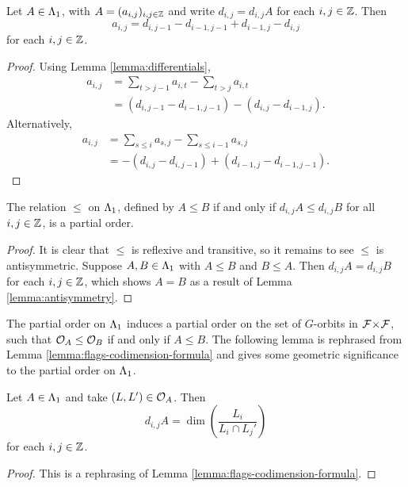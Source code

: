 \documentclass[a4paper, 11pt]{report}
\begin{document}
\begin{lemma}\label{lemma:antisymmetry}
Let $A\in{\Lambda_1}$, with $A = (a_{i,j})_{i,j\in\mathbb{Z}}$ and write $d_{i,j}=d_{i,j}A$ for each $i,j\in\mathbb{Z}$. Then
\begin{equation*}
a_{i,j} = d_{i,j-1} - d_{i-1,j-1} + d_{i-1,j} - d_{i,j}
\end{equation*}
for each $i,j\in\mathbb{Z}$.
\end{lemma}
\begin{proof}
Using Lemma \ref{lemma:differentials},
\begin{align*}
a_{i,j}
&= \sum_{t>j-1}a_{i,t} - \sum_{t>j}a_{i,t}\\
&= (d_{i,j-1} - d_{i-1,j-1}) - (d_{i,j} - d_{i-1,j}).
\end{align*}
Alternatively,
\begin{align*}
a_{i,j}
&= \sum_{s\le i}a_{s,j} - \sum_{s\le i-1}a_{s,j}\\
&= -(d_{i,j}-d_{i,j-1}) + (d_{i-1,j} - d_{i-1,j-1}).
\end{align*}
\end{proof}

\begin{lemma}\label{lemma:orbit-poset}
The relation $\le$ on ${\Lambda_1}$, defined by $A\le B$ if and only if $d_{i,j}A\le d_{i,j}B$ for all $i,j\in\mathbb{Z}$, is a partial order.
\end{lemma}

\begin{proof}
It is clear that $\le$ is reflexive and transitive, so it remains to see $\le$ is antisymmetric. Suppose $A,B\in{\Lambda_1}$ with $A\le B$ and $B\le A$. Then $d_{i,j}A = d_{i,j}B$ for each $i,j\in\mathbb{Z}$, which shows $A=B$ as a result of Lemma \ref{lemma:antisymmetry}.  
\end{proof}

The partial order on ${\Lambda_1}$ induces a partial order on the set of $G$-orbits in ${\mathcal{F}\!\times\!\mathcal{F}}$, such that $\mathcal{O}_{A}\le \mathcal{O}_{B}$ if and only if $A\le B$. The following lemma is rephrased from Lemma \ref{lemma:flags-codimension-formula} and gives some geometric significance to the partial order on ${\Lambda_1}$.

\begin{lemma}\label{lemma:codimension-fomula-corner-sums}
Let $A\in{\Lambda_1}$ and take $(L,L')\in\mathcal{O}_{A}$. Then
\begin{equation*}
d_{i,j}A = \dim\left(\frac{L_i}{L_i\cap L_j'}\right)
\end{equation*}
for each $i,j\in\mathbb{Z}$.
\end{lemma}
\begin{proof}
This is a rephrasing of Lemma \ref{lemma:flags-codimension-formula}.
\end{proof}
\end{document}
